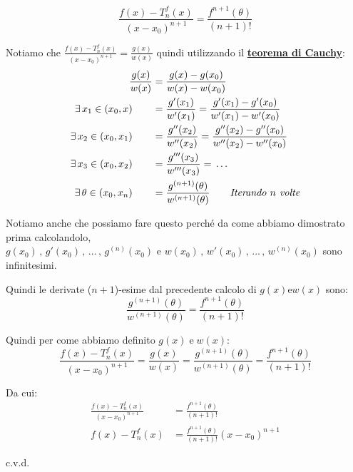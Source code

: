 \documentclass[../../dimostrazioni]{subfiles}
\begin{document}
            \[  \frac{f(x) - T _n ^ f (x)}{(x-x_0)^{n+1}} = \frac{f^{n+1}(\theta)}{(n+1)!}    \]

            Notiamo che \(  \frac{f(x) - T _n ^ f (x)}{(x-x_0)^{n+1}} = \frac{g(x)}{w(x)}    \) quindi utilizzando il \textbf{\hyperref[teoCauchy]{teorema di Cauchy}}:
            \begin{align*}
                \frac{g(x)}{w(x)} &= \frac{g(x) - g(x_0)}{w(x) - w(x_0)}\\
                \exists \, x_1 \in (x_0, x) \qquad &= \frac{g'(x_1)}{w'(x_1)} = \frac{g'(x_1) - g'(x_0)}{w'(x_1) - w'(x_0)}\\
                \exists \, x_2 \in (x_0, x_1) \qquad &= \frac{g''(x_2)}{w''(x_2)} = \frac{g''(x_2) - g''(x_0)}{w''(x_2) - w''(x_0)}\\
                \exists \, x_3 \in (x_0, x_2) \qquad &= \frac{g'''(x_3)}{w'''(x_3)} = \, \dots\\
                \exists \, \theta \in (x_0, x_n) \qquad &= \frac{g^{(n+1)}(\theta)}{w^{(n+1)}(\theta)} \qquad \text{\emph{Iterando \(n\) volte}}
            \end{align*}

            Notiamo anche che possiamo fare questo perché da come abbiamo dimostrato prima calcolandolo,\\
            \(g(x_0)\,,\, g'(x_0)\,,\, \dots\,,\, g^{(n)} (x_0) \) e \( w(x_0)\,,\, w'(x_0)\,,\, \dots\,,\, w^{(n)} (x_0)\) sono infinitesimi.\\

            \newpage
            
            Quindi le derivate (\(n+1\))-esime dal precedente calcolo di \(g(x) \text{e} w(x)\) sono:
            \[  \frac{g^{(n+1)}(\theta)}{w^{(n+1)}(\theta)} = \frac{f^{n+1}(\theta)}{(n+1)!} \]

            Quindi per come abbiamo definito \(g(x) \; \text{e} \; w(x)\):
            \[  \frac{f(x) - T _n ^ f (x)}{(x-x_0)^{n+1}} = \frac{g(x)}{w(x)} = \frac{g^{(n+1)}(\theta)}{w^{(n+1)}(\theta)} = \frac{f^{n+1}(\theta)}{(n+1)!}   \]

            Da cui:
            \begin{align*}
                \frac{f(x) - T _n ^ f (x)}{(x-x_0)^{n+1}} &= \frac{f^{n+1}(\theta)}{(n+1)!}\\
                f(x) - T _n ^ f (x) &= \frac{f^{n+1}(\theta)}{(n+1)!}(x-x_0)^{n+1}
            \end{align*}

            c.v.d.
        
\end{document}
